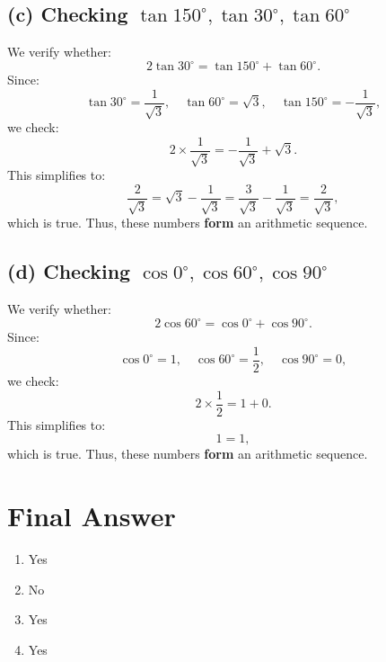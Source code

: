 \documentclass{article}
\begin{document}
\subsection*{(c) Checking $\tan 150^\circ, \tan 30^\circ, \tan 60^\circ$}
We verify whether:
\[
2 \tan 30^\circ = \tan 150^\circ + \tan 60^\circ.
\]
Since:
\[
\tan 30^\circ = \frac{1}{\sqrt{3}}, \quad \tan 60^\circ = \sqrt{3}, \quad \tan 150^\circ = -\frac{1}{\sqrt{3}},
\]
we check:
\[
2 \times \frac{1}{\sqrt{3}} = -\frac{1}{\sqrt{3}} + \sqrt{3}.
\]
This simplifies to:
\[
\frac{2}{\sqrt{3}} = \sqrt{3} - \frac{1}{\sqrt{3}} = \frac{3}{\sqrt{3}} - \frac{1}{\sqrt{3}} = \frac{2}{\sqrt{3}},
\]
which is true. Thus, these numbers \textbf{form} an arithmetic sequence.

\subsection*{(d) Checking $\cos 0^\circ, \cos 60^\circ, \cos 90^\circ$}
We verify whether:
\[
2 \cos 60^\circ = \cos 0^\circ + \cos 90^\circ.
\]
Since:
\[
\cos 0^\circ = 1, \quad \cos 60^\circ = \frac{1}{2}, \quad \cos 90^\circ = 0,
\]
we check:
\[
2 \times \frac{1}{2} = 1 + 0.
\]
This simplifies to:
\[
1 = 1,
\]
which is true. Thus, these numbers \textbf{form} an arithmetic sequence.

\section*{Final Answer}
\begin{enumerate}
    \item Yes
    \item No
    \item Yes
    \item Yes
\end{enumerate}
\end{document}

